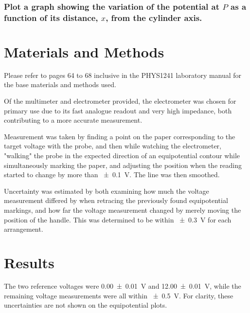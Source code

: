 \documentclass[a4paper]{scrartcl}
\begin{document}
\subsubsection{Plot a graph showing the variation of the potential at \(P\) as a function of its distance, \(x\), from the cylinder axis.}
\begin{center}
\end{center}

\section{Materials and Methods}
Please refer to pages 64 to 68 inclusive in the PHYS1241 laboratory manual for the base materials and methods used.

Of the multimeter and electrometer provided, the electrometer was chosen for primary use due to its fast analogue readout and very high impedance, both contributing to a more accurate measurement.

Measurement was taken by finding a point on the paper corresponding to the target voltage with the probe, and then while watching the electrometer, "walking" the probe in the expected direction of an equipotential contour while simultaneously marking the paper, and adjusting the position when the reading started to change by more than \SI{\pm 0.1}{\volt}. The line was then smoothed.

Uncertainty was estimated by both examining how much the voltage measurement differed by when retracing the previously found equipotential markings, and how far the voltage measurement changed by merely moving the position of the handle. This was determined to be within \SI{\pm 0.3}{\volt} for each arrangement.

\section{Results}
The two reference voltages were \SI{0.00 \pm 0.01}{\volt} and \SI{12.00 \pm 0.01}{\volt}, while the remaining voltage measurements were all within \SI{\pm 0.5}{\volt}. For clarity, these uncertainties are not shown on the equipotential plots.
\end{document}
